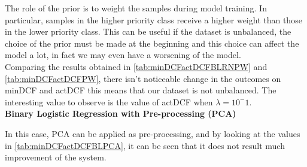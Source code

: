 The role of the prior is to weight the samples during model training.
In particular, samples in the higher priority class receive a higher weight than those in the lower priority class.
This can be useful if the dataset is unbalanced, the choice of the prior must be made at the beginning and this choice
can affect the model a lot, in fact we may even have a worsening of the model. \\
Comparing the results obtained in \autoref{tab:minDCFactDCFBLRNPW} and \autoref{tab:minDCFactDCFPW},
there isn't noticeable change in the outcomes on minDCF and actDCF this means that our dataset is not unbalanced.
The interesting value to observe is the value of actDCF when \(\lambda= 10^-1\).\\

\textbf{Binary Logistic Regression with Pre-processing (PCA)}\par
In this case, PCA can be applied as pre-processing, and by looking at the values in \autoref{tab:minDCFactDCFBLPCA},
it can be seen that it does not result much improvement of the system.

